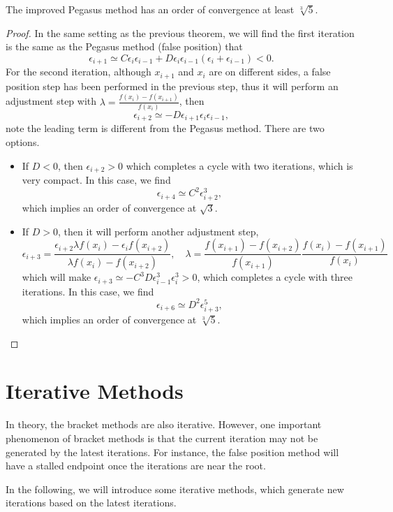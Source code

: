 \begin{theorem}
The improved Pegasus method has an order of convergence at least $\sqrt[3]{5}$.
\end{theorem}
\begin{proof}
In the same setting as the previous theorem, we will find the first iteration is the same as the Pegasus method (false position) that
$$\epsilon_{i+1}\simeq C \epsilon_i \epsilon_{i-1} + D \epsilon_i \epsilon_{i-1}(\epsilon_{i} + \epsilon_{i-1}) < 0.$$
For the second iteration, although $x_{i+1}$ and $x_{i}$ are on different sides, a false position step has been performed in the previous step, thus it will perform an adjustment step with $\lambda = \frac{f(x_{i}) - f(x_{i+1})}{f(x_{i})}$, then
$$\epsilon_{i+2} \simeq -D \epsilon_{i+1}\epsilon_{i}\epsilon_{i-1},$$
note the leading term is different from the Pegasus method. There are two options.
\begin{itemize}
    \item If $D < 0$, then $\epsilon_{i+2} > 0$ which completes a cycle with two iterations, which is very compact. In this case, we find
    $$\epsilon_{i+4} \simeq C^{2}  \epsilon_{i+2}^3,$$
    which implies an order of convergence at $\sqrt{3}$.
    \item If $D > 0$, then it will perform another adjustment step,
    $$\epsilon_{i+3} =  \frac{\epsilon_{i+2}\lambda f(x_i) - \epsilon_i f(x_{i+2})}{\lambda f(x_{i}) - f(x_{i+2})},\quad \lambda = \frac{f(x_{i+1})-f(x_{i+2})}{f(x_{i+1})}\frac{f(x_{i})-f(x_{i+1}) }{ f(x_{i})}$$
    which will make $\epsilon_{i+3} \simeq -C^3 D \epsilon_{i-1}^3 \epsilon_i^3 > 0$, which completes a cycle with three iterations. In this case, we find
    $$\epsilon_{i+6} \simeq D^{2}  \epsilon_{i+3}^5,$$
    which implies an order of convergence at $\sqrt[3]{5}$. 
\end{itemize}
\end{proof}

\section{Iterative Methods}
\label{Sec: 0-IT-ME}
In theory, the bracket methods are also iterative. However, one important phenomenon of bracket methods is that the current iteration may not be generated by the latest iterations. For instance, the false position method will have a stalled endpoint once the iterations are near the root.

In the following, we will introduce some iterative methods, which generate new iterations based on the latest iterations.

